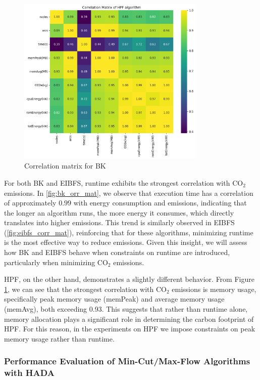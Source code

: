 \documentclass[a4paper,singleside,12pt]{report} %
\begin{document}
\begin{figure}[h!]
    \centering
    \includegraphics[width=0.8\textwidth]{imgs/hpf_corr_mat.png}
    \caption{Correlation matrix for BK}
    \label{fig:hpf_flow_corr_mat}
\end{figure}

For both BK and EIBFS, runtime exhibits the strongest correlation with CO$_2$ emissions. In \ref{fig:bk_orr_mat}, we observe that execution time has a correlation of approximately
$0.99$ with energy consumption and emissions, indicating that the longer an algorithm runs, the more energy it consumes, which directly translates into higher emissions. This trend 
is similarly observed in EIBFS (\ref{fig:eibfs_corr_mat}), reinforcing that for these algorithms, minimizing runtime is the most effective way to reduce emissions. Given this insight, 
we will assess how BK and EIBFS behave when constraints on runtime are introduced, particularly when minimizing CO$_2$ emissions.

HPF, on the other hand, demonstrates a slightly different behavior. From Figure \ref{fig:hpf_flow_corr_mat}, we can see that the strongest correlation with CO$_2$ emissions is memory usage, 
specifically peak memory usage (memPeak) and average memory usage (memAvg), both exceeding 0.93. This suggests that rather than runtime alone, memory allocation plays a significant 
role in determining the carbon footprint of HPF. For this reason, in the experiments on HPF we impose constraints on peak memory usage rather than runtime.

\subsubsection{Performance Evaluation of Min-Cut/Max-Flow Algorithms with HADA}
\end{document}
